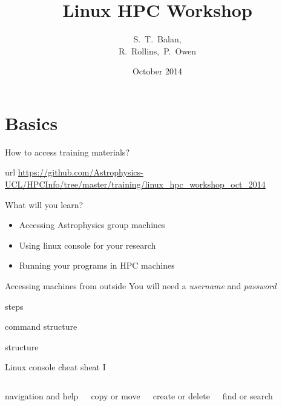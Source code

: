 \documentclass{beamer}
\title[Linux HPC Workshop] %
{Linux HPC Workshop}
\author[Balan,Rollins,Owen] %
{S.~T.~Balan,\\[3mm]
R.~Rollins,~P.~Owen}
\institute[UCL]
{
  Department of Physics and Astronomy\\
  University College London
}
\date[Linux HPC 2014]
{October 2014}
\begin{document}
\frame{\titlepage}

\section{Basics}

\begin{frame}{How to access training materials?}
  \begin{block}{url}
    \url{https://github.com/Astrophysics-UCL/HPCInfo/tree/master/training/linux_hpc_workshop_oct_2014}
  \end{block}
\end{frame}


\begin{frame}{What will you learn?}
  \begin{itemize}
    \item Accessing Astrophysics group machines
    \item Using linux console for your research
    \item Running your programs in HPC machines
  \end{itemize}
\end{frame}

\begin{frame}[fragile]{Accessing machines from outside}
  \alert{You will need a \emph{username} and \emph{password}}
  \begin{block}{steps}
    
  \end{block}
\end{frame}

\begin{frame}[fragile]{command structure}
  \begin{block}{structure}
    
  \end{block}
  \begin{example}
    
  \end{example}
\end{frame}


\begin{frame}[fragile]{Linux console cheat sheat I}
  \fontsize{7pt}{7}\selectfont
  \begin{columns}
    \begin{block}{navigation and help}
      
    \end{block}
    \begin{block}{copy or move}
      
    \end{block}

    \begin{block}{create or delete}
      
    \end{block}
    \begin{block}{find or search}
      
    \end{block}
  \end{columns}
\end{frame}
\end{document}
